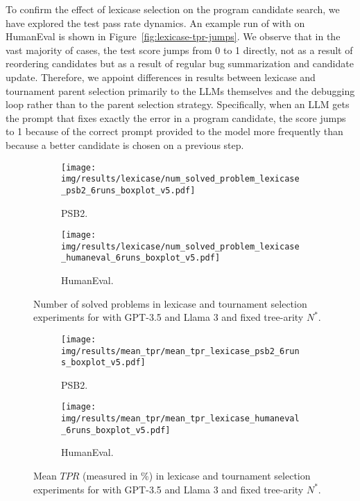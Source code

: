 To confirm the effect of lexicase selection on the program candidate search, we have explored the test pass rate dynamics.
An example run of \method{} with \gpt{} on HumanEval is shown in Figure~\ref{fig:lexicase-tpr-jumps}.
We observe that in the vast majority of cases, the test score jumps from 0 to 1 directly, not as a result of reordering candidates but as a result of \method{} regular bug summarization and candidate update.
Therefore, we appoint differences in results between lexicase and tournament parent selection primarily to the LLMs themselves and the debugging loop rather than to the parent selection strategy. 
Specifically, when an LLM gets the prompt that fixes exactly the error in a program candidate, the score jumps to 1 because of the correct prompt provided to the model more frequently than because a better candidate is chosen on a previous step.






\begin{figure}[bt]
\begin{subfigure}{.45\linewidth}
\centering
\texttt{[image: img/results/lexicase/num\_solved\_problem\_lexicase\_psb2\_6runs\_boxplot\_v5.pdf]}
  \caption{PSB2.}
  \label{fig:num-solved-lexicase-selection-psb2}
\end{subfigure}
% 
\begin{subfigure}{.45\linewidth}
\centering
\texttt{[image: img/results/lexicase/num\_solved\_problem\_lexicase\_humaneval\_6runs\_boxplot\_v5.pdf]}
  \caption{HumanEval.}
  \label{fig:num-solved-lexicase-selection-he}
\end{subfigure}
\caption{Number of solved problems in lexicase and tournament selection experiments for \method{} with GPT-3.5 and Llama 3 and fixed tree-arity $N^*$.}
\label{fig:num-solved-lexicase-selection}
\end{figure}
\begin{figure}[bt]
% 
\begin{subfigure}{.45\linewidth}
\centering
\texttt{[image: img/results/mean\_tpr/mean\_tpr\_lexicase\_psb2\_6runs\_boxplot\_v5.pdf]}
  \caption{PSB2.}
  \label{fig:mean-tpr-lexicase-selection-psb2}
\end{subfigure}
% 
\begin{subfigure}{.45\linewidth}
\centering
\texttt{[image: img/results/mean\_tpr/mean\_tpr\_lexicase\_humaneval\_6runs\_boxplot\_v5.pdf]}
  \caption{HumanEval.}
  \label{fig:mean-tpr-lexicase-selection-he}
\end{subfigure}
\caption{Mean $TPR$ (measured in \%) in lexicase and tournament selection experiments for \method{} with GPT-3.5 and Llama 3 and fixed tree-arity $N^*.$}
\label{fig:mean-tpr-lexicase-selection}
\end{figure}

